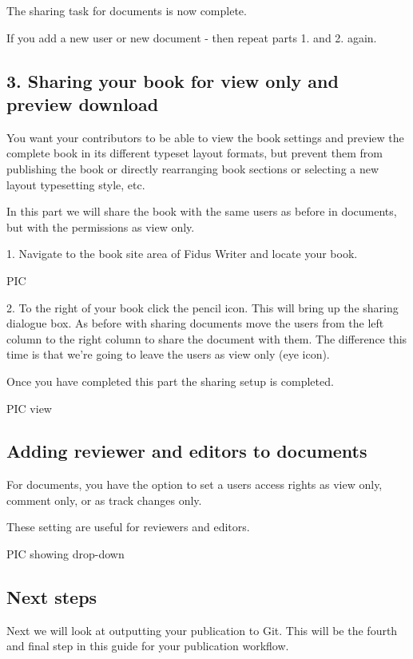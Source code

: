 \documentclass{article}
\begin{document}
The sharing task for documents is now complete.


If you add a new user or new document - then repeat parts 1. and 2. again.


\subsection{3. Sharing your book for view only and preview download}\label{H6251349}



You want your contributors to be able to view the book settings and preview the complete book in its different typeset layout formats, but prevent them from publishing the book or directly rearranging book sections or selecting a new layout typesetting style, etc.


In this part we will share the book with the same users as before in documents, but with the permissions as view only.


1. Navigate to the book site area of Fidus Writer and locate your book.


PIC


2. To the right of your book click the pencil icon. This will bring up the sharing dialogue box. As before with sharing documents move the users from the left column to the right column to share the document with them. The difference this time is that we're going to leave the users as view only (eye icon).


Once you have completed this part the sharing setup is completed.


PIC view


\subsection{Adding reviewer and editors to documents}\label{H5018454}



For documents, you have the option to set a users access rights as view only, comment only, or as track changes only.


These setting are useful for reviewers and editors.


PIC showing drop-down


\subsection{Next steps}\label{H4422568}



Next we will look at outputting your publication to Git. This will be the fourth and final step in this guide for your publication workflow.
\end{document}
